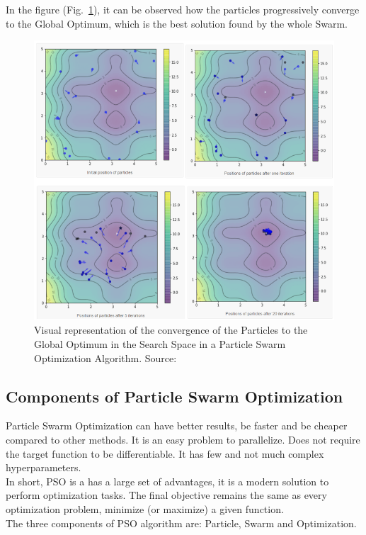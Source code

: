 In the figure (Fig.~\ref{fig:figure-3.2.1}), it can be observed how the particles progressively converge to the Global Optimum, which is the best solution found by the whole Swarm.
\begin{figure}[t]
	\centering
	\includegraphics[width=14cm]{figures/figure-3.2.1.png}
	\caption[Visual Representation of Particle Swarm Optimization]{Visual representation of the convergence of the Particles to the Global Optimum in the Search Space in a Particle Swarm Optimization Algorithm. Source:~\cite{Tesi-3.1}}
	\label{fig:figure-3.2.1}
\end{figure}

\subsection{Components of Particle Swarm Optimization}

Particle Swarm Optimization can have better results, be faster and be cheaper compared to other methods. It is an easy problem to parallelize. Does not require the target function to be differentiable. It has few and not much complex hyperparameters.
\\[0.3cm]In short, PSO is a has a large set of advantages, it is a modern solution to perform optimization tasks. The final objective remains the same as every optimization problem, minimize (or maximize) a given function.
\\[0.3cm]The three components of PSO algorithm are: Particle, Swarm and Optimization.

